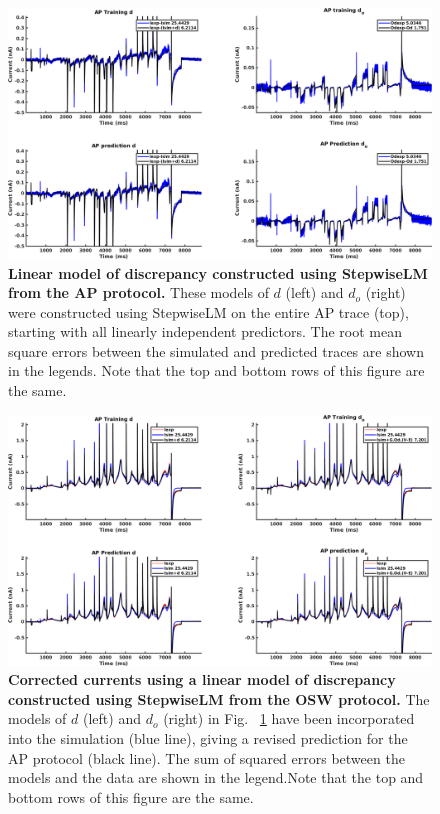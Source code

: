 \documentclass[11pt,a4paper,oneside]{article}
\begin{document}
\clearpage

\begin{figure}[t]
\begin{center}
\includegraphics[scale=0.42]{Figures/StepwiseLM_AP_AP_full_discrepancy.png}
\caption{\textbf{Linear model of discrepancy constructed using StepwiseLM from the AP protocol.} These models of $d$ (left) and $d_o$ (right) were constructed using StepwiseLM on the entire AP trace (top), starting with all linearly independent predictors. The root mean square errors between the simulated and predicted traces are shown in the legends. Note that the top and bottom rows of this figure are the same. } 
\label{Fig_StepwiseLM_AP_AP_full_discrepancy}
\end{center}
\end{figure}

\begin{figure}[hb]
\begin{center}
\includegraphics[scale=0.42]{Figures/StepwiseLM_AP_AP_full_currents.png}
\caption{\textbf{Corrected currents using a linear model of discrepancy constructed using StepwiseLM from the OSW protocol.} The models of $d$ (left) and $d_o$ (right) in Fig. ~\ref{Fig_StepwiseLM_AP_AP_full_discrepancy} have been incorporated into the simulation (blue line), giving a revised prediction for the AP protocol (black line). The sum of squared errors between the models and the data are shown in the legend.Note that the top and bottom rows of this figure are the same.}
\label{Fig_StepwiseLM_AP_AP_full_currents}
\end{center}
\end{figure}
\end{document}
